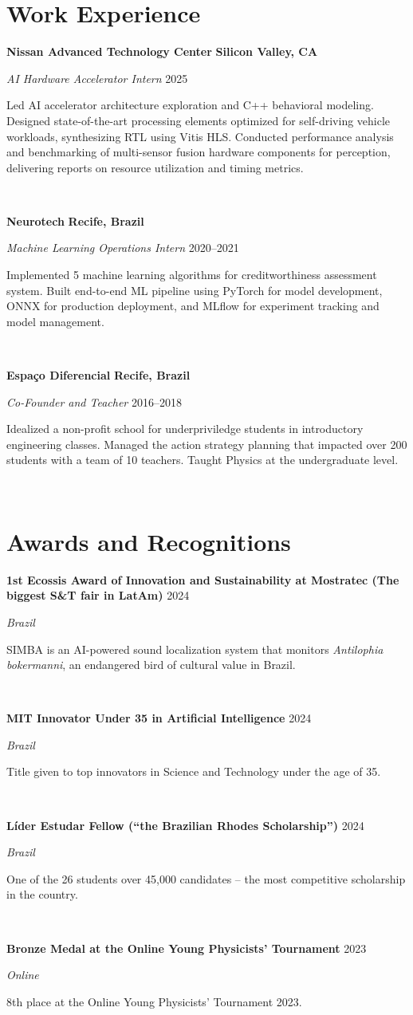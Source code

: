 \documentclass[letterpaper,10pt]{article}
\newcommand{\entry}[4]{

\begin{minipage}[t]{.15\textwidth}
\end{minipage}
\hfill\vline\hfill 
\begin{minipage}[t]{0.95\textwidth}
#2 \hfill \textsc{#1}

\textit{#3}

\footnotesize{#4}
\end{minipage}\\\vspace{.25cm}}
\newcommand{\we}[5]{

\begin{minipage}[t]{.15\textwidth}
\end{minipage}
\hfill\vline\hfill 
\begin{minipage}[t]{0.95\textwidth}
#2 \hfill \textbf{#5}

\textit{#3} \hfill \textsc{#1}

\footnotesize{#4}
\end{minipage}\\\vspace{.25cm}}
\begin{document}
\section{Work Experience}
\vspace*{.1cm}
\we{2025}{\textbf{Nissan Advanced Technology Center}}{AI Hardware Accelerator Intern}{
	Led AI accelerator architecture exploration and C++ behavioral modeling. Designed state-of-the-art processing elements optimized for self-driving vehicle workloads, synthesizing RTL using Vitis HLS. Conducted performance analysis and benchmarking of multi-sensor fusion hardware components for perception, delivering reports on resource utilization and timing metrics.
	}{Silicon Valley, CA}
\we{2020--2021}{\textbf{Neurotech}}{Machine Learning Operations Intern}{
	Implemented 5 machine learning algorithms for creditworthiness assessment system. Built end-to-end ML pipeline using PyTorch for model development, ONNX for production deployment, and MLflow for experiment tracking and model management.
	}{Recife, Brazil}
\we{2016--2018}{\textbf{Espaço Diferencial}}{Co-Founder and Teacher}{
	Idealized a non-profit school for underpriviledge students in introductory engineering classes. Managed the action strategy planning that impacted over 200 students with a team of 10 teachers. Taught Physics at the undergraduate level.
	}{Recife, Brazil}
\vspace*{-.25cm}
\section{Awards and Recognitions}
\vspace*{.1cm}

\entry{2024}{\textbf{1st Ecossis Award of Innovation and Sustainability at Mostratec (The biggest S\&T fair in LatAm)}}{Brazil}{
	SIMBA is an AI-powered sound localization system that monitors \textit{Antilophia bokermanni}, an endangered bird of cultural value in Brazil.	
}

\entry{2024}{\textbf{MIT Innovator Under 35 in Artificial Intelligence}}{Brazil}{
	Title given to top innovators in Science and Technology under the age of 35.	
}

\entry{2024}{\textbf{Líder Estudar Fellow (``the Brazilian Rhodes Scholarship'')} }{Brazil}{
	One of the 26 students over 45,000 candidates -- the most competitive scholarship in the country.	
}

\entry{2023}{\textbf{Bronze Medal at the Online Young Physicists' Tournament}}{Online}{
	8th place at the Online Young Physicists' Tournament 2023.	
}
\end{document}
